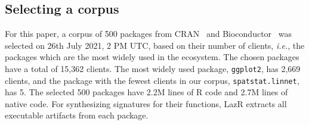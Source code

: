\documentclass[review,creen,acmsmall]{acmart}
\renewcommand{\c}[1]{\lstinline |#1|\xspace}
\newcommand{\lazr}{{\sf LazR}\xspace}
\begin{document}
\subsection{Selecting a corpus}\label{sec:corpus}

For this paper, a corpus of 500 packages from CRAN~\cite{ligges2017} and
Bioconductor~\cite{bioc} was selected on 26th July 2021, 2 PM UTC, based on
their number of clients, \emph{i.e.}, the packages which are the most widely
used in the ecosystem. The chosen packages have a total of 15,362 clients. The
most widely used package, \c{ggplot2}, has 2,669 clients, and the package with
the fewest clients in our corpus, \c{spatstat.linnet}, has 5. The selected 500
packages have 2.2M lines of R code and 2.7M lines of native code. For
synthesizing signatures for their functions, \lazr extracts all executable
artifacts from each package.
\end{document}
